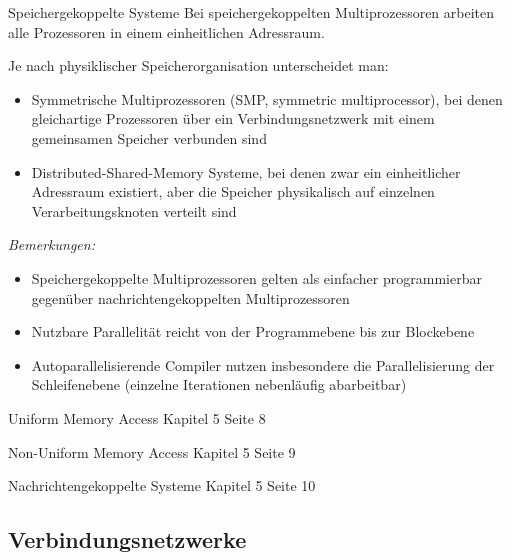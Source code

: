 \begin{defi}{Speichergekoppelte Systeme}
    Bei speichergekoppelten Multiprozessoren arbeiten alle Prozessoren in einem einheitlichen Adressraum.
    
    Je nach physiklischer Speicherorganisation unterscheidet man:
    \begin{itemize}
        \item Symmetrische Multiprozessoren (SMP, symmetric multiprocessor),
              bei denen gleichartige Prozessoren über ein Verbindungsnetzwerk mit einem gemeinsamen Speicher verbunden sind
        \item Distributed-Shared-Memory Systeme,
              bei denen zwar ein einheitlicher Adressraum existiert, 
              aber die Speicher physikalisch auf einzelnen Verarbeitungsknoten verteilt sind
    \end{itemize}
    
    \emph{Bemerkungen:}
    \begin{itemize}
        \item Speichergekoppelte Multiprozessoren gelten als einfacher programmierbar gegenüber nachrichtengekoppelten Multiprozessoren
        \item Nutzbare Parallelität reicht von der Programmebene bis zur Blockebene
        \item Autoparallelisierende Compiler nutzen insbesondere die Parallelisierung der Schleifenebene (einzelne Iterationen nebenläufig abarbeitbar)
    \end{itemize}
\end{defi}

\begin{defi}{Uniform Memory Access}
    Kapitel 5 Seite 8
\end{defi}

\begin{defi}{Non-Uniform Memory Access}
    Kapitel 5 Seite 9
\end{defi}

\begin{defi}{Nachrichtengekoppelte Systeme}
    Kapitel 5 Seite 10
\end{defi}

\subsection{Verbindungsnetzwerke}

